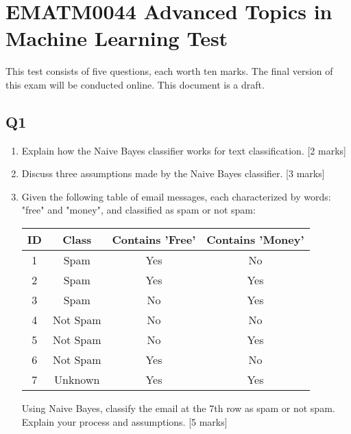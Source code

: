 \documentclass[a4wide]{article}
\begin{document}
\section*{EMATM0044 Advanced Topics in Machine Learning Test}

This test consists of five questions, each worth ten marks. The final version of this exam will be conducted online. This document is a draft.

\subsection*{Q1}
\begin{enumerate}
\item Explain how the Naive Bayes classifier works for text classification. [2 marks]
\item Discuss three assumptions made by the Naive Bayes classifier. [3 marks]
\item Given the following table of email messages, each characterized by words: "free" and "money", and classified as spam or not spam:
\begin{center}
\begin{tabular}{|c|c|c|c|}
\hline
ID & Class & Contains 'Free' & Contains 'Money' \\
\hline
1  & Spam  & Yes             & No               \\
2  & Spam  & Yes             & Yes              \\
3  & Spam  & No              & Yes              \\
4  & Not Spam & No           & No               \\
5  & Not Spam & No           & Yes              \\
6  & Not Spam & Yes          & No               \\
7  & Unknown & Yes           & Yes              \\
\hline
\end{tabular}
\end{center}
Using Naive Bayes, classify the email at the 7th row as spam or not spam. Explain your process and assumptions. [5 marks]
\end{enumerate}
\end{document}

